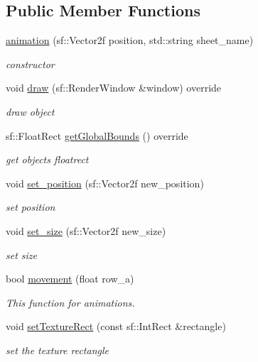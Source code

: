 \subsection*{Public Member Functions}
\begin{DoxyCompactItemize}
\item 
\hyperlink{classanimation_ab0a44a89f36d6f04c4e21e868441d693}{animation} (sf\+::\+Vector2f position, std\+::string sheet\+\_\+name)
\begin{DoxyCompactList}\small\item\em constructor \end{DoxyCompactList}\item 
void \hyperlink{classanimation_a20959b66d1c25007890bb40f0e876570}{draw} (sf\+::\+Render\+Window \&window) override
\begin{DoxyCompactList}\small\item\em draw object \end{DoxyCompactList}\item 
sf\+::\+Float\+Rect \hyperlink{classanimation_aae3322323bf3dea83723969f364e18e0}{get\+Global\+Bounds} () override
\begin{DoxyCompactList}\small\item\em get objects floatrect \end{DoxyCompactList}\item 
void \hyperlink{classanimation_ac461adb38b8241427150c4620ee31358}{set\+\_\+position} (sf\+::\+Vector2f new\+\_\+position)
\begin{DoxyCompactList}\small\item\em set position \end{DoxyCompactList}\item 
void \hyperlink{classanimation_a7c0b874294e81f3612590920fd845602}{set\+\_\+size} (sf\+::\+Vector2f new\+\_\+size)
\begin{DoxyCompactList}\small\item\em set size \end{DoxyCompactList}\item 
bool \hyperlink{classanimation_a79260eb98a4f77aa4b9f3b08cc8e5b59}{movement} (float row\+\_\+a)
\begin{DoxyCompactList}\small\item\em This function for animations. \end{DoxyCompactList}\item 
void \hyperlink{classanimation_a30e84ff71206b8ec4f82fd70ad776036}{set\+Texture\+Rect} (const sf\+::\+Int\+Rect \&rectangle)
\begin{DoxyCompactList}\small\item\em set the texture rectangle \end{DoxyCompactList}\end{DoxyCompactItemize}
